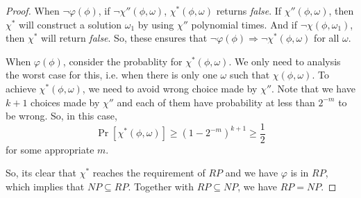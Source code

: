 \documentclass{article}
\begin{document}
\begin{proof}
  When $\lnot\varphi(\phi)$, if $\lnot\chi''(\phi, \omega)$, $\chi^*(\phi,\omega)$ returns \textit{false}.
  If $\chi''(\phi,\omega)$, then $\chi^*$ will construct a solution $\omega_1$ by using $\chi''$ polynomial times.
  And if $\lnot\chi(\phi,\omega_1)$, then $\chi^*$ will return \textit{false}.
  So, these ensures that $\lnot\varphi(\phi) \Rightarrow \lnot\chi^*(\phi, \omega)$ for all $\omega$.

  When $\varphi(\phi)$, consider the probablity for $\chi^*(\phi, \omega)$.
  We only need to analysis the worst case for this, i.e. when there is only one $\omega$ such that $\chi(\phi,\omega)$.
  To achieve $\chi^*(\phi,\omega)$, we need to avoid wrong choice made by $\chi''$.
  Note that we have $k+1$ choices made by $\chi''$ and each of them have probability at less than $2^{-m}$ to be wrong.
  So, in this case,
    \[\Pr[\chi^*(\phi, \omega)] \geq (1-2^{-m})^{k+1} \geq \frac{1}{2}\]
  for some appropriate $m$.

  So, its clear that $\chi^*$ reaches the requirement of $RP$ and we have $\varphi$ is in $RP$,
  which implies that $NP\subseteq RP$.
  Together with $RP\subseteq NP$, we have $RP = NP$.
\end{proof}
\end{document}
